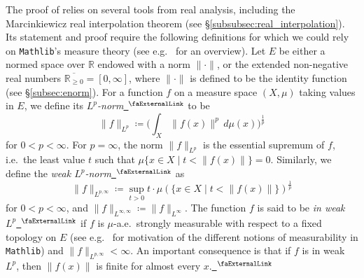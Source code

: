 \documentclass[12pt, reqno]{amsart}
\newcommand*{\real}{\mathbb{R}} %
\newcommand{\ennreal}{\overline{\real_{\ge0}}}
\newcommand{\mathlib}{\texttt{Mathlib}\xspace}
\newcommand{\extlink}{~\ensuremath{{}^\text{\faExternalLink}}}
\theoremstyle{definition}
\theoremstyle{plain}
\begin{document}
The proof of  relies on several tools from real analysis, including the Marcin\-kiewicz real interpolation theorem (see \S\ref{subsubsec:real_interpolation}). Its statement and proof require the following definitions for which we could rely on \mathlib's measure theory (see e.g.\ \cite{vanDoornFormalizedHaarMeasure} for an overview).
Let $E$ be either a normed space over $\mathbb{R}$ endowed with a norm $\|\cdot\|$,
or the extended non-negative real numbers $\ennreal=[0,\infty]$, where $\|\cdot\|$ is defined to be the identity function (see \S\ref{subsec:enorm}). For a function $f$ on a measure space $(X,\mu)$ taking values in $E$, we define its \emph{$L^p$-norm}\href{https://github.com/leanprover-community/mathlib4/blob/b63493a4746b4651fceb3bcf3a4651cc36a4b8de/Mathlib/MeasureTheory/Function/LpSeminorm/Defs.lean#L83-L87}{\extlink} to be
\begin{equation*}
  \|f\|_{L^{p}} \coloneq \big(\int_X\|f(x)\|^p\, d\mu(x)\big) ^ \frac{1}{p}
\end{equation*}
for $0<p<\infty$. For $p=\infty$, the norm $\|f\|_{L^{p}}$ is the essential supremum of $f$, i.e.\ the least value $t$ such that
$\mu\{x\in X \mid t < \|f(x)\| \}=0$. Similarly, we define the \emph{weak $L^p$-norm}\href{https://github.com/fpvandoorn/carleson/blob/AFM-frozen/Carleson/ToMathlib/WeakType.lean#L37-L38}{\extlink} as
\begin{equation*}
  \|f\|_{L^{p,\infty}} \coloneq \sup_{t>0} t \cdot \mu (\{x\in X \mid t < \|f(x)\| \}) ^ \frac{1}{p}
\end{equation*}
for $0<p<\infty$, and $\|f\|_{L^{\infty,\infty}} \coloneq \|f\|_{L^{\infty}}$.
The function $f$ is said to be \emph{in weak $L^p$}\href{https://github.com/fpvandoorn/carleson/blob/AFM-frozen/Carleson/ToMathlib/WeakType.lean#L285-L286}{\extlink} if $f$ is $\mu$-a.e.\ strongly measurable with respect to a fixed topology on $E$ (see e.g.\ \cite{GouezelChangeOfVariables} for motivation of the different notions of measurability in \mathlib) and $\|f\|_{L^{p,\infty}} < \infty$.
An important consequence is that if $f$ is in weak $L^p$, then $\|f(x)\|$ is finite for almost every $x$.\href{https://github.com/fpvandoorn/carleson/blob/AFM-frozen/Carleson/ToMathlib/WeakType.lean#L302}{\extlink}
\end{document}
